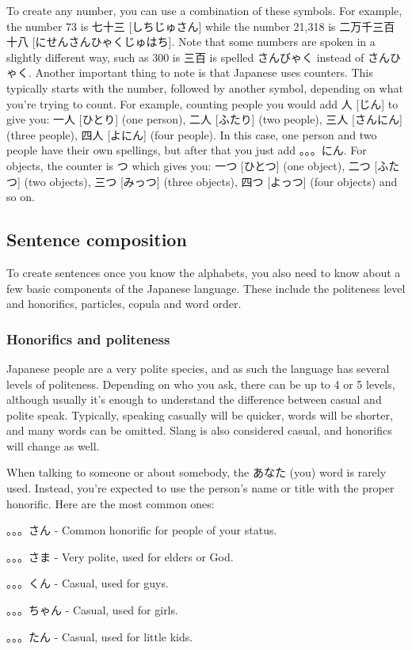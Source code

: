 \documentclass{article}
\begin{document}
\begin{CJK}{UTF8}{min}
\begin{multicols*}{3}
To create any number, you can use a combination of these symbols. For example, the number 73 is 七十三 [しちじゅさん] while the number 21,318 is 二万千三百十八 
[にせんさんひゃくじゅはち]. Note that some numbers are spoken in a slightly different way, such as 300 is 三百 is spelled さんびゃく instead of さんひゃく. Another important thing to 
note is that Japanese uses counters. This typically starts with the number, followed by another symbol, depending on what you're trying to count. For example, counting people you 
would add 人 [じん] to give you: 一人 [ひとり] (one person), 二人 [ふたり] (two people), 三人 [さんにん] (three people), 四人 [よにん] (four people). In this case, one person and two 
people have their own spellings, but after that you just add 。。。にん. For objects, the counter is つ which gives you: 一つ [ひとつ] (one object), 二つ [ふたつ] (two objects), 三つ 
[みっつ] (three objects), 四つ [よっつ] (four objects) and so on.

\subsection{Sentence composition}

To create sentences once you know the alphabets, you also need to know about a few basic components of the Japanese language. These include the politeness level and honorifics, 
particles, copula and word order.

\subsubsection{Honorifics and politeness}

Japanese people are a very polite species, and as such the language has several levels of politeness. Depending on who you ask, there can be up to 4 or 5 levels, although usually 
it's enough to understand the difference between casual and polite speak. Typically, speaking casually will be quicker, words will be shorter, and many words can be omitted. Slang is 
also considered casual, and honorifics will change as well.

When talking to someone or about somebody, the あなた (you) word is rarely used. Instead, you're expected to use the person's name or title with the proper honorific. Here are the 
most common ones:

\begin{colorize}
\item 。。。さん - Common honorific for people of your status.
\item 。。。さま - Very polite, used for elders or God.
\item 。。。くん - Casual, used for guys.
\item 。。。ちゃん - Casual, used for girls.
\item 。。。たん - Casual, used for little kids.
\end{colorize}


\end{multicols*}
\end{CJK}
\end{document}
